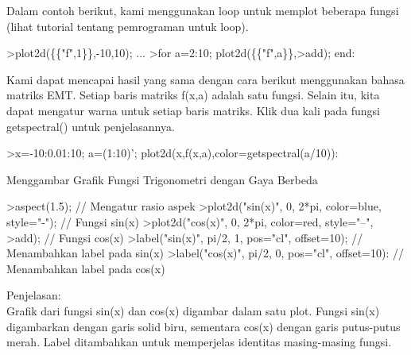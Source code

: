 \documentclass{article}
\begin{document}
\begin{eulernotebook}
\begin{eulercomment}
\begin{eulercomment}
\begin{eulercomment}
\begin{eulercomment}
\begin{eulercomment}
\begin{eulercomment}
\begin{eulercomment}
\begin{eulercomment}
\begin{eulercomment}
\begin{eulercomment}
\begin{eulercomment}
\begin{eulercomment}
\begin{eulercomment}
Dalam contoh berikut, kami menggunakan loop untuk memplot beberapa
fungsi (lihat tutorial tentang pemrograman untuk loop).
\end{eulercomment}
\begin{eulerprompt}
>plot2d(\{\{"f",1\}\},-10,10); ...
>for a=2:10; plot2d(\{\{"f",a\}\},>add); end:
\end{eulerprompt}
\begin{eulercomment}
Kami dapat mencapai hasil yang sama dengan cara berikut menggunakan
bahasa matriks EMT. Setiap baris matriks f(x,a) adalah satu fungsi.
Selain itu, kita dapat mengatur warna untuk setiap baris matriks. Klik
dua kali pada fungsi getspectral() untuk penjelasannya.
\end{eulercomment}
\begin{eulerprompt}
>x=-10:0.01:10; a=(1:10)'; plot2d(x,f(x,a),color=getspectral(a/10)):
\end{eulerprompt}
\eulersubheading{}
\begin{eulercomment}
\end{eulercomment}
\begin{eulerttcomment}
 Menggambar Grafik Fungsi Trigonometri dengan Gaya Berbeda
\end{eulerttcomment}
\begin{eulercomment}
\end{eulercomment}
\begin{eulerprompt}
>aspect(1.5); // Mengatur rasio aspek
>plot2d("sin(x)", 0, 2*pi, color=blue, style="-"); // Fungsi sin(x)
>plot2d("cos(x)", 0, 2*pi, color=red, style="--", >add); // Fungsi cos(x)
>label("sin(x)", pi/2, 1, pos="cl", offset=10); // Menambahkan label pada sin(x)
>label("cos(x)", pi/2, 0, pos="cl", offset=10): // Menambahkan label pada cos(x)
\end{eulerprompt}
\begin{eulercomment}
Penjelasan:\\
Grafik dari fungsi sin(x) dan cos(x) digambar dalam satu plot. Fungsi
sin(x) digambarkan dengan garis solid biru, sementara cos(x) dengan
garis putus-putus merah. Label ditambahkan untuk memperjelas identitas
masing-masing fungsi.\\

\end{eulercomment}
\end{eulercomment}
\end{eulercomment}
\end{eulercomment}
\end{eulercomment}
\end{eulercomment}
\end{eulercomment}
\end{eulercomment}
\end{eulercomment}
\end{eulercomment}
\end{eulercomment}
\end{eulercomment}
\end{eulercomment}
\end{eulernotebook}
\end{document}
